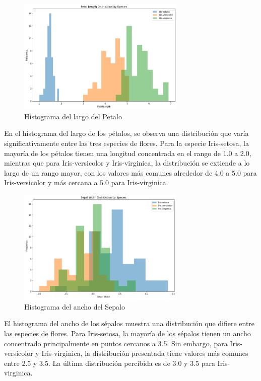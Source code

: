 \documentclass[conference]{IEEEtran}
\begin{document}
\begin{figure}[ht]
  \includegraphics[width=80mm]{images/petal_length.png}
  \caption{Histograma del largo del Petalo}\label{fig2}
\end{figure}
\FloatBarrier

En el histograma del largo de los pétalos, se observa una distribución que varía significativamente entre las tres especies de flores. Para la especie Iris-setosa, la mayoría de los pétalos tienen una longitud concentrada en el rango de 1.0 a 2.0, mientras que para Iris-versicolor y Iris-virginica, la distribución se extiende a lo largo de un rango mayor, con los valores más comunes alrededor de 4.0 a 5.0 para Iris-versicolor y más cercana a 5.0 para Iris-virginica.

\begin{figure}[ht]
  \includegraphics[width=80mm]{images/sepal_width.png}
  \caption{Histograma del ancho del Sepalo}\label{fig3}
\end{figure}
\FloatBarrier

El histograma del ancho de los sépalos muestra una distribución que difiere entre las especies de flores. Para Iris-setosa, la mayoría de los sépalos tienen un ancho concentrado principalmente en puntos cercanos a 3.5. Sin embargo, para Iris-versicolor y Iris-virginica, la distribución presentada tiene valores más comunes entre 2.5 y 3.5. La última distribución percibida es de 3.0 y 3.5 para Iris-virginica.
\end{document}
